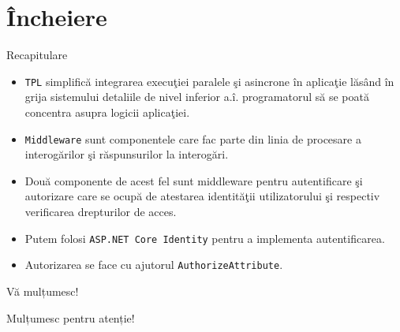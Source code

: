 \documentclass[presentation]{beamer}
\begin{document}
\section{Încheiere}
\label{sec:org7e4fa60}
\begin{frame}[label={sec:org6ae7c3a},fragile]{Recapitulare}
 \begin{itemize}
\item \texttt{TPL} simplifică integrarea execuţiei paralele şi asincrone în aplicaţie lăsând în grija sistemului detaliile de nivel inferior a.î. programatorul să se poată concentra asupra logicii aplicaţiei.
\item \texttt{Middleware} sunt componentele care fac parte din linia de procesare a interogărilor şi răspunsurilor la interogări.
\item Două componente de acest fel sunt middleware pentru autentificare şi autorizare care se ocupă de atestarea identităţii utilizatorului şi respectiv verificarea drepturilor de acces.
\item Putem folosi \texttt{ASP.NET Core Identity} pentru a implementa autentificarea.
\item Autorizarea se face cu ajutorul \texttt{AuthorizeAttribute}.
\end{itemize}
\end{frame}
\begin{frame}[label={sec:org6fee171}]{Vă mulțumesc!}
\begin{center}
Mulțumesc pentru atenție!
\end{center}
\end{frame}
\end{document}

